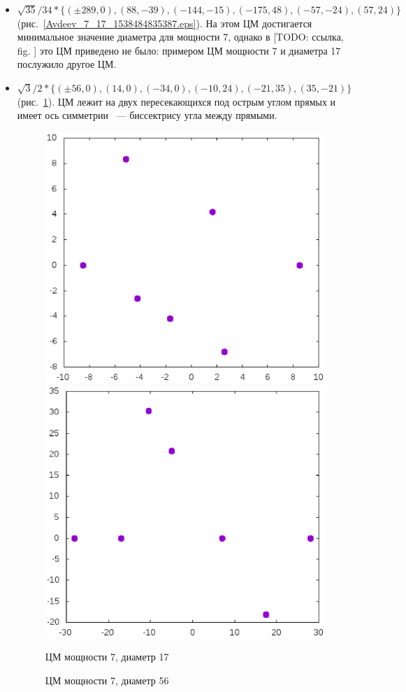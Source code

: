 \documentclass[12pt]{article}
\begin{document}
\begin{itemize}
\setlength{\itemsep}{-1mm}


\item
$\sqrt{35}/{34} * \{ (\pm 289, 0),
(88 , -39),
(-144 , -15),
(-175 , 48),
(-57 , -24),
(57 , 24)\} $
(рис.~\ref{Avdeev_7_17_1538484835387.eps}).
На этом ЦМ достигается минимальное значение диаметра для мощности 7,
однако в [TODO: ссылка, fig. ] это ЦМ приведено не было:
примером ЦМ мощности 7 и диаметра 17 послужило другое ЦМ.

\item
$\sqrt{3}/2 * \{
( \pm 56 , 0),
( 14 , 0),
( -34 , 0),
( -10 , 24),
( -21 , 35),
( 35 , -21)
\}
$
(рис.~\ref{Avdeev_7_56_1538484851696.eps}).
ЦМ лежит на двух пересекающихся под острым углом прямых и имеет ось симметрии
~--- биссектрису угла между прямыми.


\begin{figure}[htbp]
	\includegraphics[width=.48\linewidth]{Avdeev_7_17_1538484835387.eps}
	\hfill
	\includegraphics[width=.48\linewidth]{Avdeev_7_56_1538484851696.eps}
	\\
	\parbox{.48\linewidth}{\caption{ЦМ мощности 7, диаметр 17}\label{Avdeev_7_17_1538484835387.eps}}
	\hfill
	\parbox{.48\linewidth}{\caption{ЦМ мощности 7, диаметр 56}\label{Avdeev_7_56_1538484851696.eps}}
\end{figure}



\end{itemize}
\end{document}
